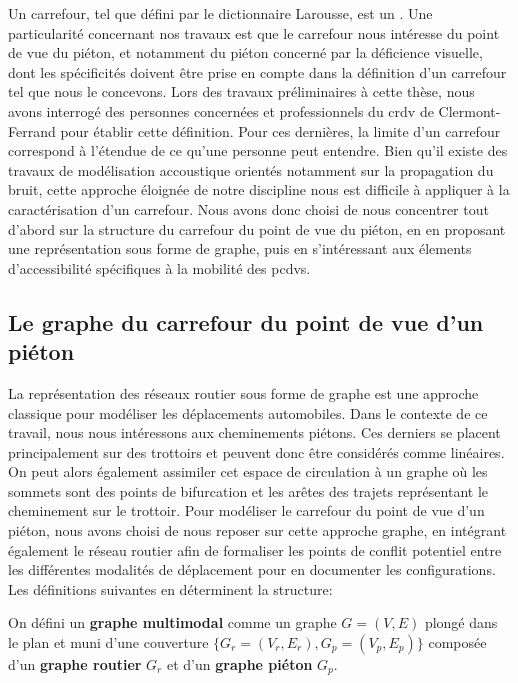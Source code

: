 Un carrefour, tel que défini par le dictionnaire Larousse, est un . Une particularité concernant nos travaux est que le carrefour nous intéresse du point de vue du piéton, et notamment du piéton concerné par la déficience visuelle, dont les spécificités doivent être prise en compte dans la définition d'un carrefour tel que nous le concevons. Lors des travaux préliminaires à cette thèse, nous avons interrogé des personnes concernées et professionnels du \gls{crdv} de Clermont-Ferrand pour établir cette définition. Pour ces dernières, la limite d'un carrefour correspond à l'étendue de ce qu'une personne peut entendre. Bien qu'il existe des travaux de modélisation accoustique \citep{Bullen1977} orientés notamment sur la propagation du bruit, cette approche éloignée de notre discipline nous est difficile à appliquer à la caractérisation d'un carrefour. Nous avons donc choisi de nous concentrer tout d'abord sur la structure du carrefour du point de vue du piéton, en en proposant une représentation sous forme de graphe, puis en s'intéressant aux élements d'accessibilité spécifiques à la mobilité des \glspl{pcdv}.

\subsection{Le graphe du carrefour du point de vue d'un piéton}

\label{sec:modelisation_definitions}

La représentation des réseaux routier sous forme de graphe est une approche classique pour modéliser les déplacements automobiles. Dans le contexte de ce travail, nous nous intéressons aux cheminements piétons. Ces derniers se placent principalement sur des trottoirs et peuvent donc être considérés comme linéaires. On peut alors également assimiler cet espace de circulation à un graphe où les sommets sont des points de bifurcation et les arêtes des trajets représentant le cheminement sur le trottoir. Pour modéliser le carrefour du point de vue d'un piéton, nous avons choisi de nous reposer sur cette approche graphe, en intégrant également le réseau routier afin de formaliser les points de conflit potentiel entre les différentes modalités de déplacement pour en documenter les configurations. Les définitions suivantes en déterminent la structure:

\begin{definition}
    On défini un \textbf{graphe multimodal} comme un graphe $G = (V,E)$ plongé dans le plan et muni d'une couverture $\{G_r=(V_r, E_r), G_p = (V_p, E_p)\}$ composée d'un \textbf{graphe routier} $G_r$ et d'un \textbf{graphe piéton} $G_p$.
\end{definition}

